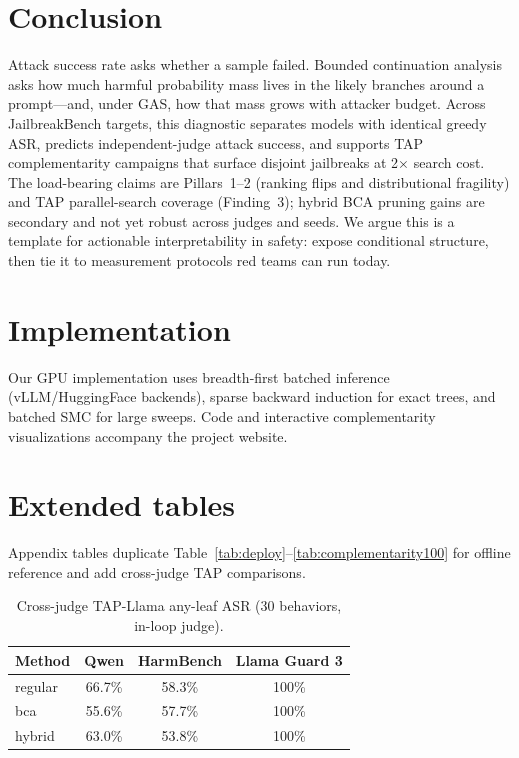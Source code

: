 \documentclass{article}
\newcommand{\BCA}{\textsc{BCA}}
\newcommand{\ASR}{\textsc{ASR}}
\newcommand{\GAS}{\textsc{GAS}}
\newcommand{\SMC}{\textsc{SMC}}
\begin{document}
\section{Conclusion}

Attack success rate asks whether a sample failed.
Bounded continuation analysis asks how much harmful probability mass lives in the likely branches around a prompt---and, under \GAS{}, how that mass grows with attacker budget.
Across JailbreakBench targets, this diagnostic separates models with identical greedy \ASR{}, predicts independent-judge attack success, and supports \textsc{TAP} complementarity campaigns that surface disjoint jailbreaks at 2$\times$ search cost.
The load-bearing claims are Pillars~1--2 (ranking flips and distributional fragility) and \textsc{TAP} parallel-search coverage (Finding~3); hybrid \BCA{} pruning gains are secondary and not yet robust across judges and seeds.
We argue this is a template for actionable interpretability in safety: expose conditional structure, then tie it to measurement protocols red teams can run today.




\appendix
\section{Implementation}
\label{app:impl}

Our GPU implementation uses breadth-first batched inference (vLLM/HuggingFace backends), sparse backward induction for exact trees, and batched \SMC{} for large sweeps.
Code and interactive complementarity visualizations accompany the project website.

\section{Extended tables}
\label{app:comp}

Appendix tables duplicate Table~\ref{tab:deploy}--\ref{tab:complementarity100} for offline reference and add cross-judge \textsc{TAP} comparisons.

\begin{table}[h]
\centering
\small
\caption{Cross-judge \textsc{TAP}-Llama any-leaf \ASR{} (30 behaviors, in-loop judge).}
\begin{tabular}{lccc}
\toprule
Method & Qwen & HarmBench & Llama Guard 3 \\
\midrule
regular & 66.7\% & 58.3\% & 100\% \\
bca & 55.6\% & 57.7\% & 100\% \\
hybrid & 63.0\% & 53.8\% & 100\% \\
\bottomrule
\end{tabular}
\end{table}
\end{document}
